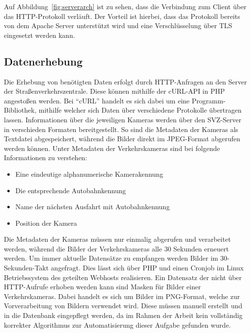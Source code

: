 Auf Abbildung~\ref{fig:serverarch} ist zu sehen, dass die Verbindung zum Client über das HTTP-Protokoll verläuft. Der Vorteil ist hierbei, dass das Protokoll bereits von dem Apache Server unterstützt wird und eine Verschlüsselung über TLS eingesetzt werden kann.
\subsection{Datenerhebung}
\label{sec:datenerhebung}
Die Erhebung von benötigten Daten erfolgt durch HTTP-Anfragen an den Server der Straßenverkehrszentrale. Diese können mithilfe der cURL-API in PHP angestoßen werden. Bei "`cURL"' handelt es sich dabei um eine Programm-Bibliothek, mithilfe welcher sich Daten über verschiedene Protokolle übertragen lassen. \newline
Informationen über die jeweiligen Kameras werden über den SVZ-Server in verschieden Formaten bereitgestellt. So sind die Metadaten der Kameras als Textdatei abgespeichert, während die Bilder direkt im JPEG-Format abgerufen werden können. Unter Metadaten der Verkehrskameras sind bei folgende Informationen zu verstehen: 
\begin{itemize}
\item{Eine eindeutige alphanumerische Kamerakennung}
\item{Die entsprechende Autobahnkennung}
\item{Name der nächsten Ausfahrt mit Autobahnkennung}
\item{Position der Kamera}
\end{itemize}
Die Metadaten der Kameras müssen nur einmalig abgerufen und verarbeitet werden, während die Bilder der Verkehrskameras alle 30 Sekunden erneuert werden. Um immer aktuelle Datensätze zu empfangen werden Bilder im 30-Sekunden-Takt angefragt. Dies lässt sich über PHP und einen Cronjob im Linux Betriebssystem des geteilten Webhosts realisieren.
Ein Datensatz der nicht über HTTP-Aufrufe erhoben werden kann sind Masken für Bilder einer Verkehrskameras.
Dabei handelt es sich um Bilder im PNG-Format, welche zur Vorverarbeitung von Bildern verwendet wird. Diese müssen manuell erstellt und in die Datenbank eingepflegt werden, da im Rahmen der Arbeit kein vollständig korrekter Algorithmus zur Automatisierung dieser Aufgabe gefunden wurde.

